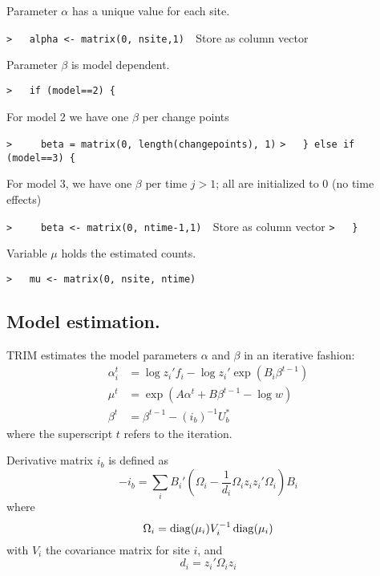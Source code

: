 \documentclass[a4paper]{article}
\begin{document}
Parameter $\alpha$ has a unique value for each site.\par
\verb~>   alpha <- matrix(0, nsite,1)  ~{\sffamily Store as column vector}\par

Parameter $\beta$ is model dependent.\par
\verb~>   if (model==2) {~\par
For model 2 we have one $\beta$ per change points\par
\verb~>     beta = matrix(0, length(changepoints), 1)~\newline
\verb~>   } else if (model==3) {~\par
For model 3, we have one $\beta$ per time $j>1$; all are initialized to 0 (no time effects)\par
\verb~>     beta <- matrix(0, ntime-1,1)  ~{\sffamily Store as column vector}\newline
\verb~>   }~\par

Variable $\mu$ holds the estimated counts.\par
\verb~>   mu <- matrix(0, nsite, ntime)~\par



\subsection{Model estimation.}\par

TRIM estimates the model parameters $\alpha$ and $\beta$ in an iterative fashion:
\begin{align}
\alpha_i^t &= \log z_i' f_i - \log z_i' \exp(B_i \beta^{t-1}) \label{alpha} \\
\mu^t &= \exp(A\alpha^t + B\beta^{t-1} - \log w) \label{mu} \\
\beta^t &= \beta^{t-1} - (i_b)^{-1} U_b^\ast \label{beta}
\end{align}
where the superscript $t$ refers to the iteration.\par

Derivative matrix $i_b$ is defined as
\begin{equation}
  -i_b = \sum_i B_i' \left(\Omega_i - \frac{1}{d_i}\Omega_i z_i z_i' \Omega_i\right) B_i \label{i_b}
\end{equation}
where
\begin{equation}
  \Omega_i = \operatorname{diag}(\mu_i) V_i^{-1} \operatorname{diag}(\mu_i) \label{Omega_i}
\end{equation}
with $V_i$ the covariance matrix for site $i$, and
\begin{equation}
  d_i = z_i' \Omega_i z_i \label{d_i}
\end{equation}\par
\end{document}
